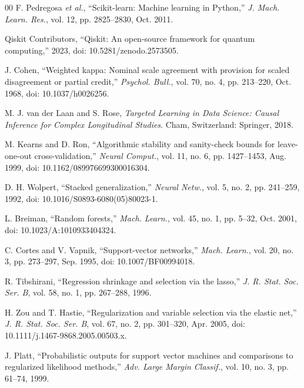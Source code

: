 \documentclass[conference]{IEEEtran}
\begin{document}
\begin{thebibliography}{00}
F. Pedregosa \emph{et al.}, ``Scikit-learn: Machine learning in Python,'' \emph{J. Mach. Learn. Res.}, vol. 12, pp. 2825--2830, Oct. 2011.

Qiskit Contributors, ``Qiskit: An open-source framework for quantum computing,'' 2023, doi: 10.5281/zenodo.2573505.

J. Cohen, ``Weighted kappa: Nominal scale agreement with provision for scaled disagreement or partial credit,'' \emph{Psychol. Bull.}, vol. 70, no. 4, pp. 213--220, Oct. 1968, doi: 10.1037/h0026256.

M. J. van der Laan and S. Rose, \emph{Targeted Learning in Data Science: Causal Inference for Complex Longitudinal Studies}. Cham, Switzerland: Springer, 2018.

M. Kearns and D. Ron, ``Algorithmic stability and sanity-check bounds for leave-one-out cross-validation,'' \emph{Neural Comput.}, vol. 11, no. 6, pp. 1427--1453, Aug. 1999, doi: 10.1162/089976699300016304.

D. H. Wolpert, ``Stacked generalization,'' \emph{Neural Netw.}, vol. 5, no. 2, pp. 241--259, 1992, doi: 10.1016/S0893-6080(05)80023-1.

L. Breiman, ``Random forests,'' \emph{Mach. Learn.}, vol. 45, no. 1, pp. 5--32, Oct. 2001, doi: 10.1023/A:1010933404324.

C. Cortes and V. Vapnik, ``Support-vector networks,'' \emph{Mach. Learn.}, vol. 20, no. 3, pp. 273--297, Sep. 1995, doi: 10.1007/BF00994018.

R. Tibshirani, ``Regression shrinkage and selection via the lasso,'' \emph{J. R. Stat. Soc. Ser. B}, vol. 58, no. 1, pp. 267--288, 1996.

H. Zou and T. Hastie, ``Regularization and variable selection via the elastic net,'' \emph{J. R. Stat. Soc. Ser. B}, vol. 67, no. 2, pp. 301--320, Apr. 2005, doi: 10.1111/j.1467-9868.2005.00503.x.

J. Platt, ``Probabilistic outputs for support vector machines and comparisons to regularized likelihood methods,'' \emph{Adv. Large Margin Classif.}, vol. 10, no. 3, pp. 61--74, 1999.

\end{thebibliography}
\end{document}
